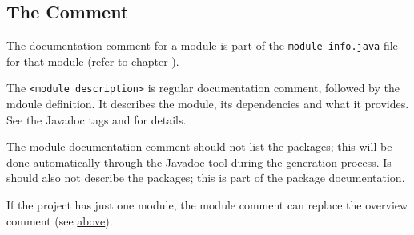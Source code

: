 \subsection{The  Comment}\label{sec:ModuleComment}
The documentation comment for a module is part of the \texttt{module-info.java} file for that module (refer to chapter ).

The \texttt{<module description>} is regular documentation comment, followed by the mdoule definition. It describes the module, its dependencies and what it provides. See the Javadoc tags  and  for details.

The module documentation comment should not list the packages; this will be done automatically through the Javadoc tool during the generation process. Is should also not describe the packages; this is part of the package documentation.
 
If the project has just one module, the module comment can replace the overview comment (see \hyperref[sec:OverviewDoc]{above}).


